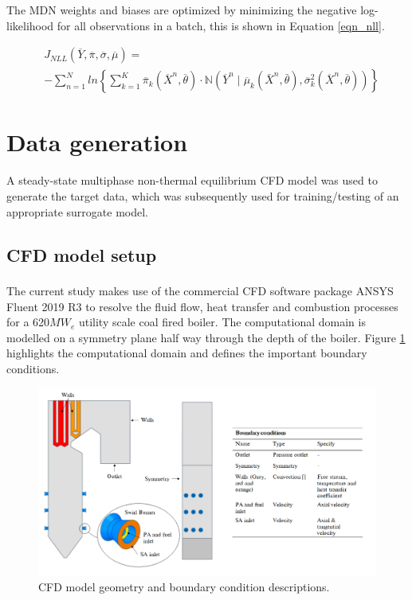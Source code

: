 \documentclass[a4paper,fleqn]{cas-dc}
\begin{document}
The MDN weights and biases are optimized by minimizing the negative log-likelihood for all observations in a batch, this is shown in Equation \ref{eqn_nll}.

\begin{equation}\label{eqn_nll}
\begin{split}
&J_{NLL}(\overline{Y},\overline{\pi},\overline{\sigma},\overline{\mu})=\\
&-\sum^N_{n=1}ln\left\{\sum^K_{k=1}\overline{\pi}_k(\overline{X}^n,\overline{\theta})\cdot \mathbb{N}(\overline{Y}^n\mid\overline{\mu}_k(\bar{X}^n,\bar{\theta}),\overline{\sigma}^2_k(\overline{X}^n,\overline{\theta})) \right\}
\end{split}
\end{equation}


\section{Data generation}
A steady-state multiphase non-thermal equilibrium CFD model was used to generate the target data, which was subsequently used for training/testing of an appropriate surrogate model.

\subsection{CFD model setup}
The current study makes use of the commercial CFD software package ANSYS\textsuperscript{\textregistered} Fluent 2019 R3 to resolve the fluid flow, heat transfer and combustion processes for a 620$MW_e$ utility scale coal fired boiler. The computational domain is modelled on a symmetry plane half way through the depth of the boiler. Figure \ref{fig_cfd_geom_bc} highlights the computational domain and defines the important boundary conditions.\\ 

\begin{figure}[h!]
	\centering
		\includegraphics[scale=0.5]{CFD_GEOMETRY}
	  \caption{CFD model geometry and boundary condition descriptions.}\label{fig_cfd_geom_bc}
\end{figure}
\end{document}

